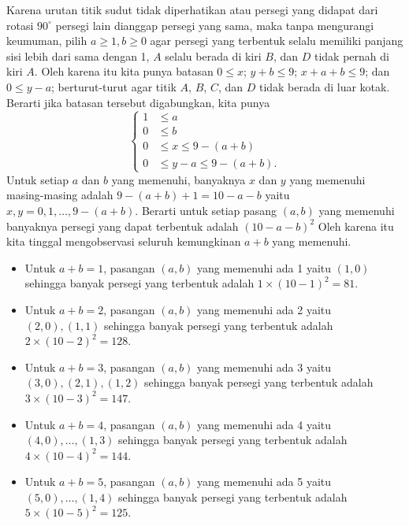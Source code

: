 \documentclass[12pt]{scrartcl}
\begin{document}
\begin{solusi}
\begin{center}
\end{center}
 Karena urutan titik sudut tidak diperhatikan atau persegi yang didapat dari rotasi $90^\circ$ persegi lain dianggap persegi yang sama, maka tanpa mengurangi keumuman, pilih $a \ge 1,b \ge 0$ agar persegi yang terbentuk selalu memiliki panjang sisi lebih dari sama dengan 1, $A$ selalu berada di kiri $B$, dan $D$ tidak pernah di kiri $A$. Oleh karena itu kita punya batasan $0 \le x$; $y+b \le 9$; $x+a+b \le 9$; dan $0 \le y-a$; berturut-turut agar titik $A$, $B$, $C$, dan $D$ tidak berada di luar kotak. Berarti jika batasan tersebut digabungkan, kita punya
 $$
 \begin{cases}
 1 &\le a\\
 0 &\le b\\ 
 0 &\le x \le 9-(a+b)\\
 0 &\le y-a \le 9-(a+b).
 \end{cases}
 $$
 Untuk setiap $a$ dan $b$ yang memenuhi, banyaknya $x$ dan $y$ yang memenuhi masing-masing adalah $9-(a+b)+1 = 10-a-b$ yaitu $x,y = 0,1,\dots,9-(a+b)$. Berarti untuk setiap pasang $(a,b)$ yang memenuhi banyaknya persegi yang dapat terbentuk adalah $(10-a-b)^2$  Oleh karena itu kita tinggal mengobservasi seluruh kemungkinan $a+b$ yang memenuhi.
 \begin{itemize}
 \item Untuk $a+b=1$, pasangan $(a,b)$ yang memenuhi ada 1 yaitu $(1,0)$ sehingga banyak persegi yang terbentuk adalah $1 \times (10-1)^2 = 81$.
 \item Untuk $a+b=2$, pasangan $(a,b)$ yang memenuhi ada 2 yaitu $(2,0),(1,1)$ sehingga banyak persegi yang terbentuk adalah $2 \times (10-2)^2 = 128$.
 \item Untuk $a+b=3$, pasangan $(a,b)$ yang memenuhi ada 3 yaitu $(3,0),(2,1),(1,2)$ sehingga banyak persegi yang terbentuk adalah $3 \times (10-3)^2 = 147$.
 \item Untuk $a+b=4$, pasangan $(a,b)$ yang memenuhi ada 4 yaitu $(4,0),\dots,(1,3)$ sehingga banyak persegi yang terbentuk adalah $4 \times (10-4)^2 = 144$.
 \item Untuk $a+b=5$, pasangan $(a,b)$ yang memenuhi ada 5 yaitu $(5,0),\dots,(1,4)$ sehingga banyak persegi yang terbentuk adalah $5 \times (10-5)^2 = 125$.

\end{itemize}
\end{solusi}
\end{document}
